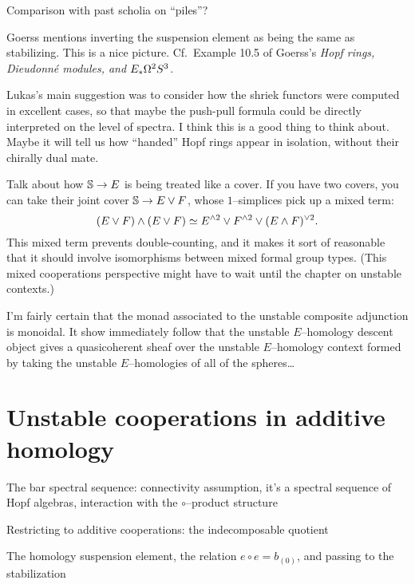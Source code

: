 Comparison with past scholia on ``piles''?


Goerss mentions inverting the suspension element as being the same as stabilizing. This is a nice picture. Cf.\ Example 10.5 of Goerss's \textit{Hopf rings, Dieudonn\'e modules, and $E_* \Loops^2 S^3$}.

Lukas's main suggestion was to consider how the shriek functors were computed in excellent cases, so that maybe the push-pull formula could be directly interpreted on the level of spectra.  I think this is a good thing to think about.  Maybe it will tell us how ``handed'' Hopf rings appear in isolation, without their chirally dual mate.

Talk about how $\S \to E$ is being treated like a cover. If you have two covers, you can take their joint cover $\S \to E \vee F$, whose $1$--simplices pick up a mixed term: \[(E \vee F) \sm (E \vee F) \simeq E^{\sm 2} \vee F^{\sm 2} \vee (E \sm F)^{\vee 2}.\]  This mixed term prevents double-counting, and it makes it sort of reasonable that it should involve isomorphisms between mixed formal group types.  (This mixed cooperations perspective might have to wait until the chapter on unstable contexts.)

I'm fairly certain that the monad associated to the unstable composite adjunction is monoidal.  It show immediately follow that the unstable $E$--homology descent object gives a quasicoherent sheaf over the unstable $E$--homology context formed by taking the unstable $E$--homologies of all of the spheres\ldots





\section{Unstable cooperations in additive homology}

The bar spectral sequence: connectivity assumption, it's a spectral sequence of Hopf algebras, interaction with the $\circ$--product structure

Restricting to additive cooperations: the indecomposable quotient

The homology suspension element, the relation $e \circ e = b_{(0)}$, and passing to the stabilization


